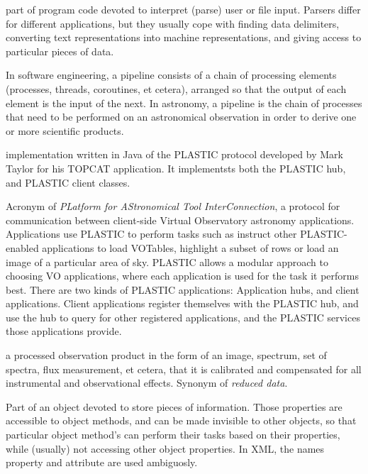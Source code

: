 {
    	part of program code devoted to interpret (parse) user or file
        input. Parsers differ for different applications, but they
        usually cope with finding data delimiters, converting text
        representations into machine representations, and giving access
        to particular pieces of data.
}

{
    	In software engineering, a pipeline consists of a chain of
        processing elements (processes, threads, coroutines, et cetera),
        arranged so that the output of each element is the input of the
        next. In astronomy, a pipeline is the chain of processes that
        need to be performed on an astronomical observation in order to
        derive one or more scientific products.
}

{
    	implementation written in \gls{Java} of the \gls{PLASTIC}
        protocol developed by Mark Taylor for his \gls{TOPCAT}
        application. It implementsts both the PLASTIC hub, and PLASTIC
        client classes.
}

{
    	Acronym of \emph{PLatform for AStronomical Tool
        InterConnection}, a protocol for communication between
        client-side \gls{Virtual Observatory} astronomy applications.
        Applications use PLASTIC to perform tasks such as instruct
        other PLASTIC-enabled applications to load \gls{VOTables},
        highlight a subset of rows or load an image of a particular
        area of sky. PLASTIC allows a modular approach to choosing VO
        applications, where each application is used for the task it
        performs best. There are two kinds of PLASTIC applications:
        Application hubs, and client applications. Client applications
        register themselves with the PLASTIC hub, and use the hub to
        query for other registered applications, and the PLASTIC
        services those applications provide.
}

{
    	a processed observation product in the form of an image,
        spectrum, set of spectra, flux measurement, et cetera, that it
        is calibrated and compensated for all instrumental and
        observational effects. Synonym of \emph{reduced data}.
}

{
    	Part of an object devoted to store pieces of information. Those
        properties are accessible to object methods, and can be made
        invisible to other objects, so that particular object method's
        can perform their tasks based on their properties, while
        (usually) not accessing other object properties. In \gls{XML},
        the names property and attribute are used ambiguosly.
}

